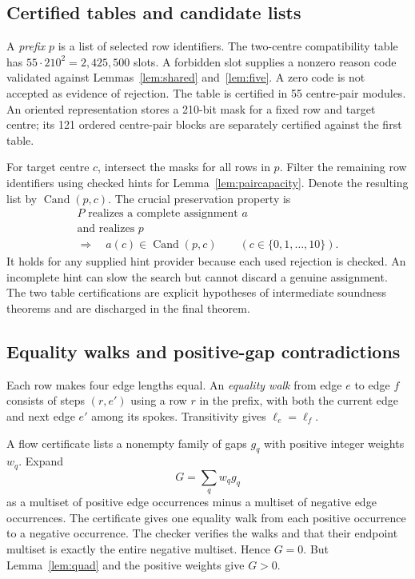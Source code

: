\documentclass[11pt,a4paper]{article}
\theoremstyle{definition}
\newcommand{\I}{\{0,1,\ldots,10\}}
\newcommand{\Cand}{\operatorname{Cand}}
\begin{document}
\subsection{Certified tables and candidate lists}
A \emph{prefix} $p$ is a list of selected row identifiers. The two-centre compatibility table has $55\cdot210^2=2,425,500$ slots. A forbidden slot supplies a nonzero reason code validated against Lemmas~\ref{lem:shared} and~\ref{lem:five}. A zero code is not accepted as evidence of rejection. The table is certified in 55 centre-pair modules. An oriented representation stores a 210-bit mask for a fixed row and target centre; its 121 ordered centre-pair blocks are separately certified against the first table.

For target centre $c$, intersect the masks for all rows in $p$. Filter the remaining row identifiers using checked hints for Lemma~\ref{lem:paircapacity}. Denote the resulting list by $\Cand(p,c)$. The crucial preservation property is
\begin{equation}\label{eq:survival}
\begin{gathered}
 \text{$P$ realizes a complete assignment $a$}\\
 \text{and realizes $p$}\\
 \Longrightarrow\quad a(c)\in\Cand(p,c)\qquad(c\in\I).
\end{gathered}
\end{equation}
It holds for any supplied hint provider because each used rejection is checked. An incomplete hint can slow the search but cannot discard a genuine assignment. The two table certifications are explicit hypotheses of intermediate soundness theorems and are discharged in the final theorem.

\subsection{Equality walks and positive-gap contradictions}
Each row makes four edge lengths equal. An \emph{equality walk} from edge $e$ to edge $f$ consists of steps $(r,e')$ using a row $r$ in the prefix, with both the current edge and next edge $e'$ among its spokes. Transitivity gives $\ell_e=\ell_f$.

A flow certificate lists a nonempty family of gaps $g_q$ with positive integer weights $w_q$. Expand
\begin{equation}\label{eq:flow}
 G=\sum_q w_qg_q
\end{equation}
as a multiset of positive edge occurrences minus a multiset of negative edge occurrences. The certificate gives one equality walk from each positive occurrence to a negative occurrence. The checker verifies the walks and that their endpoint multiset is exactly the entire negative multiset. Hence $G=0$. But Lemma~\ref{lem:quad} and the positive weights give $G>0$.
\end{document}
